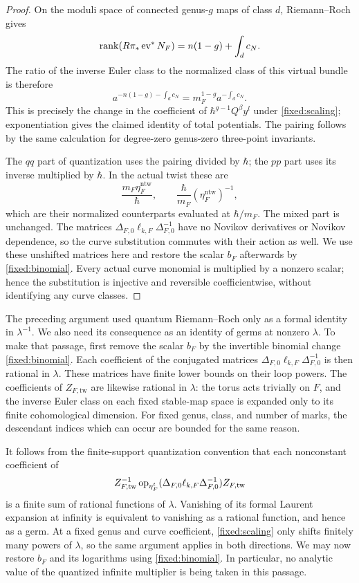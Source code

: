 \begin{proof}
On the moduli space of connected genus-$g$ maps of class $d$,
Riemann--Roch gives
\[
 \operatorname{rank}(R\pi_*\operatorname{ev}^*N_F)=n(1-g)+\int_d c_N.
\]
The ratio of the inverse Euler class to the normalized class of this
virtual bundle is therefore
\[
 a^{-n(1-g)-\int_d c_N}
       =m_F^{1-g}a^{-\int_d c_N}.
\]
This is precisely the change in the coefficient of $\hbar^{g-1}Q^\beta
y^l$ under \eqref{fixed:scaling}; exponentiation gives the claimed
identity of total potentials.  The pairing follows by the same
calculation for degree-zero genus-zero three-point invariants.

The $qq$ part of quantization uses the pairing divided by $\hbar$;
the $pp$ part uses its inverse multiplied by $\hbar$.  In the actual
twist these are
\[
 \frac{m_F\eta_F^{\mathrm{ntw}}}{\hbar},\qquad
 \frac{\hbar}{m_F}(\eta_F^{\mathrm{ntw}})^{-1},
\]
which are their normalized counterparts evaluated at $\hbar/m_F$.
The mixed part is unchanged.  The matrices
$\Delta_{F,0}\ell_{k,F}\Delta_{F,0}^{-1}$ have no Novikov derivatives or
Novikov dependence, so the curve substitution commutes with their
action as well.  We use these unshifted matrices here and restore the
scalar $b_F$ afterwards by \eqref{fixed:binomial}.  Every actual curve monomial is multiplied
by a nonzero scalar; hence the substitution is injective and reversible
coefficientwise, without identifying any curve classes.
\end{proof}

The preceding argument used quantum Riemann--Roch only as a formal
identity in $\lambda^{-1}$.  We also need its consequence as an identity
of germs at nonzero $\lambda$.  To make that passage, first remove the
scalar $b_F$ by the invertible binomial change
\eqref{fixed:binomial}.  Each coefficient of the conjugated matrices
$\Delta_{F,0}\ell_{k,F}\Delta_{F,0}^{-1}$ is then rational in $\lambda$.
These matrices have finite lower bounds on their loop powers.  The
coefficients of $Z_{F,\mathrm{tw}}$ are likewise rational in $\lambda$:
the torus acts trivially on $F$, and the inverse Euler class on each
fixed stable-map space is expanded only to its finite cohomological
dimension.  For fixed genus, class, and number of marks, the descendant
indices which can occur are bounded for the same reason.

It follows from the finite-support quantization convention that each
nonconstant coefficient of
\[
 Z_{F,\mathrm{tw}}^{-1}
   \operatorname{op}_{\eta_F^t}
     (\Delta_{F,0}\ell_{k,F}\Delta_{F,0}^{-1})
       Z_{F,\mathrm{tw}}
\]
is a finite sum of rational functions of $\lambda$.  Vanishing of its
formal Laurent expansion at infinity is equivalent to vanishing as a
rational function, and hence as a germ.  At a fixed genus and curve
coefficient, \eqref{fixed:scaling} only shifts finitely many powers of
$\lambda$, so the same argument applies in both directions.  We may now
restore $b_F$ and its logarithms using \eqref{fixed:binomial}.  In
particular, no analytic value of the quantized infinite multiplier is
being taken in this passage.

